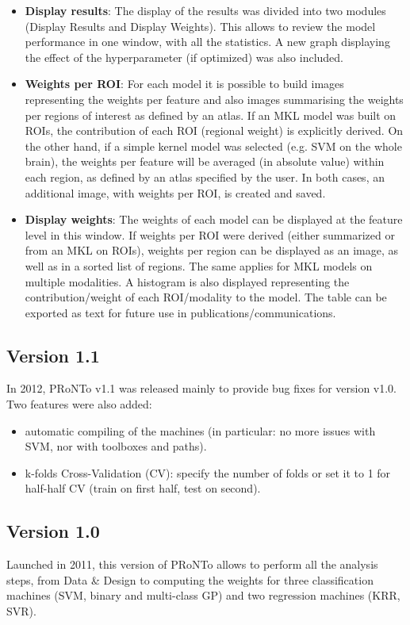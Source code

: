 \begin{itemize}
\item \textbf{Display results}: The display of the results was divided into two modules (Display Results and Display Weights). This allows to review the model performance in one window, with all the statistics. A new graph displaying the effect of the hyperparameter (if optimized) was also included.
\item \textbf{Weights per ROI}: For each model it is possible to build images representing the weights per feature and also images summarising the weights per regions of interest as defined by an atlas. If an MKL model was built on ROIs, the contribution of each ROI (regional weight) is explicitly derived. On the other hand, if a simple kernel model was selected (e.g. SVM on the whole brain), the weights per feature will be averaged (in absolute value) within each region, as defined by an atlas specified by the user. In both cases, an additional image, with weights per ROI, is created and saved.
\item \textbf{Display weights}: The weights of each model can be displayed at the feature level in this window. If weights per ROI were derived (either summarized or from an MKL on ROIs), weights per region can be displayed as an image, as well as in a sorted list of regions. The same applies for MKL models on multiple modalities. A histogram is also displayed representing the contribution/weight of each ROI/modality to the model. The table can be exported as text for future use in publications/communications.
\end{itemize}

\subsection{Version 1.1}
In 2012, PRoNTo v1.1 was released mainly to provide bug fixes for version v1.0. Two features were also added:
\begin{itemize}
\item automatic compiling of the machines (in particular: no more issues with SVM, nor with \matlab{} toolboxes and paths).
\item k-folds Cross-Validation (CV): specify the number of folds or set it to 1 for half-half CV (train on first half, test on second).
\end{itemize}

\subsection{Version 1.0}
Launched in 2011, this version of PRoNTo allows to perform all the analysis steps, from Data \& Design to computing the weights for three classification machines (SVM, binary and multi-class GP) and two regression machines (KRR, SVR).

